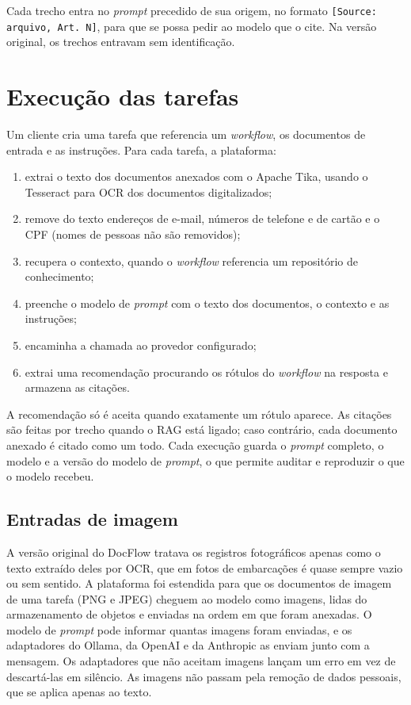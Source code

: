 Cada trecho entra no \textit{prompt} precedido de sua origem, no formato \texttt{[Source: arquivo, Art.~N]}, para que se possa pedir ao modelo que o cite. Na versão original, os trechos entravam sem identificação.

\section{Execução das tarefas}
\label{sec:execucao}

Um cliente cria uma tarefa que referencia um \textit{workflow}, os documentos de entrada e as instruções. Para cada tarefa, a plataforma:

\begin{enumerate}
	\item extrai o texto dos documentos anexados com o Apache Tika, usando o Tesseract para OCR dos documentos digitalizados;
	\item remove do texto endereços de e-mail, números de telefone e de cartão e o CPF (nomes de pessoas não são removidos);
	\item recupera o contexto, quando o \textit{workflow} referencia um repositório de conhecimento;
	\item preenche o modelo de \textit{prompt} com o texto dos documentos, o contexto e as instruções;
	\item encaminha a chamada ao provedor configurado;
	\item extrai uma recomendação procurando os rótulos do \textit{workflow} na resposta e armazena as citações.
\end{enumerate}

A recomendação só é aceita quando exatamente um rótulo aparece. As citações são feitas por trecho quando o RAG está ligado; caso contrário, cada documento anexado é citado como um todo. Cada execução guarda o \textit{prompt} completo, o modelo e a versão do modelo de \textit{prompt}, o que permite auditar e reproduzir o que o modelo recebeu.

\subsection{Entradas de imagem}

A versão original do DocFlow tratava os registros fotográficos apenas como o texto extraído deles por OCR, que em fotos de embarcações é quase sempre vazio ou sem sentido. A plataforma foi estendida para que os documentos de imagem de uma tarefa (PNG e JPEG) cheguem ao modelo como imagens, lidas do armazenamento de objetos e enviadas na ordem em que foram anexadas. O modelo de \textit{prompt} pode informar quantas imagens foram enviadas, e os adaptadores do Ollama, da OpenAI e da Anthropic as enviam junto com a mensagem. Os adaptadores que não aceitam imagens lançam um erro em vez de descartá-las em silêncio. As imagens não passam pela remoção de dados pessoais, que se aplica apenas ao texto.

